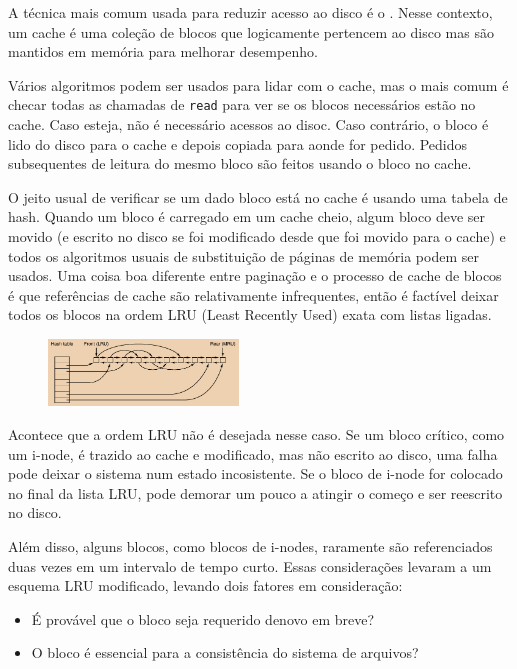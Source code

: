 \documentclass{article}
\begin{document}
A técnica mais comum usada para reduzir acesso ao disco é o . Nesse contexto, um cache é uma coleção de blocos que logicamente pertencem ao disco mas são mantidos em memória para melhorar desempenho.

Vários algoritmos podem ser usados para lidar com o cache, mas o mais comum é checar todas as chamadas de \verb|read| para ver se os blocos necessários estão no cache. Caso esteja, não é necessário acessos ao disoc. Caso contrário, o bloco é lido do disco para o cache e depois copiada para aonde for pedido. Pedidos subsequentes de leitura do mesmo bloco são feitos usando o bloco no cache.

O jeito usual de verificar se um dado bloco está no cache é usando uma tabela de hash. Quando um bloco é carregado em um cache cheio, algum bloco deve ser movido (e escrito no disco se foi modificado desde que foi movido para o cache) e todos os algoritmos usuais de substituição de páginas de memória podem ser usados. Uma coisa boa diferente entre paginação e o processo de cache de blocos é que referências de cache são relativamente infrequentes, então é factível deixar todos os blocos na ordem LRU (Least Recently Used) exata com listas ligadas.

\begin{figure}[h]
  \begin{center}
    \includegraphics[width=0.45\textwidth]{img/5-20.png}
  \end{center}
  \caption{}
  \label{fig:}
\end{figure}

Acontece que a ordem LRU não é desejada nesse caso. Se um bloco crítico, como um i-node, é trazido ao cache e modificado, mas não escrito ao disco, uma falha pode deixar o sistema num estado incosistente. Se o bloco de i-node for colocado no final da lista LRU, pode demorar um pouco a atingir o começo e ser reescrito no disco.

Além disso, alguns blocos, como blocos de i-nodes, raramente são referenciados duas vezes em um intervalo de tempo curto. Essas considerações levaram a um esquema LRU modificado, levando dois fatores em consideração:
\begin{itemize}
  \item É provável que o bloco seja requerido denovo em breve?
  \item O bloco é essencial para a consistência do sistema de arquivos?
\end{itemize}
\end{document}
